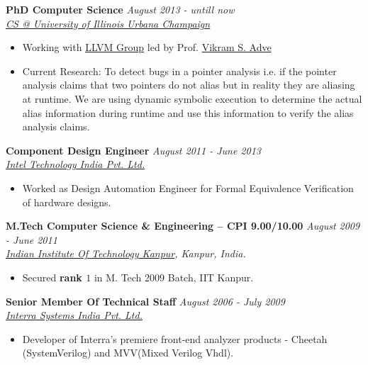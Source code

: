 \documentclass[9pt]{article}
\newenvironment{changemargin}[2]{%
  \begin{list}{}{%
    \setlength{\topsep}{0pt}%
    \setlength{\leftmargin}{#1}%
    \setlength{\rightmargin}{#2}%
    \setlength{\listparindent}{\parindent}%
    \setlength{\itemindent}{\parindent}%
    \setlength{\parsep}{\parskip}%
  }%
  \item[]}{\end{list}
}
\newenvironment{body} {
	\vspace*{-16pt}
	\begin{changemargin}{-0.25in}{-0.5in}
  }	
	{\end{changemargin}
}
\begin{document}
\begin{body}
	\vspace{14pt}
	\textbf{PhD Computer Science }{} \hfill \emph{August 2013 - untill now}{} \\
	\emph{\href{http://cs.illinois.edu/}{CS @ University of Illinois Urbana Champaign}}{} \\
	\begin{itemize} \itemsep -0pt
		\item  Working with \href{http://llvm.org/}{ LLVM Group} led by Prof. \href{http://web.engr.illinois.edu/~vadve/Home.html}{Vikram S. Adve}
		\item  Current Research: To detect bugs in a pointer analysis i.e. if the pointer analysis claims that two pointers do not alias but in reality they are aliasing at runtime. We are using dynamic symbolic execution to determine  the actual alias information during runtime and use this information  to verify the alias analysis claims.
	\end{itemize}


 \medskip
        \textbf{Component Design Engineer} \hfill \emph{August 2011 - June 2013}\\
	\emph{\href{http://www.intel.in/content/www/in/en/homepage.html}{Intel Technology India Pvt. Ltd.}}
	\begin{itemize} \itemsep -0pt
                \item Worked as Design Automation Engineer for Formal Equivalence Verification of hardware designs.
	\end{itemize}

 \medskip
	\textbf{M.Tech Computer Science \& Engineering -- CPI 9.00/10.00}{} \hfill \emph{August 2009 - June 2011}{} \\
	\emph{\href{http://www.iitk.ac.in/}{Indian Institute Of Technology Kanpur}, Kanpur, India.}{} \\
	\begin{itemize} \itemsep -0pt
		\item Secured \textbf{rank $1$} in M. Tech 2009 Batch, IIT Kanpur.
	\end{itemize}

 \medskip
        \textbf{Senior Member Of Technical Staff} \hfill \emph{August 2006 - July 2009}\\
       	\emph{\href{http://www.interrasystems.com/}{Interra Systems India Pvt. Ltd.}}
	\begin{itemize} \itemsep -0pt
		\item Developer of Interra's premiere front-end analyzer products - Cheetah (SystemVerilog) and MVV(Mixed Verilog Vhdl).
	\end{itemize}


\end{body}
\end{document}
